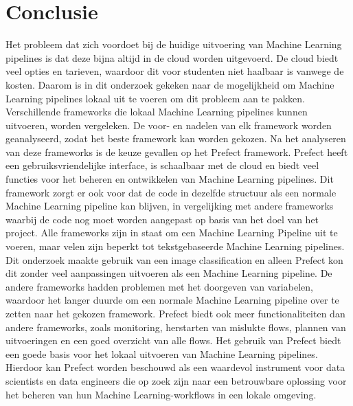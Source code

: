 
\chapter{Conclusie}%
\label{ch:conclusie}



Het probleem dat zich voordoet bij de huidige uitvoering van Machine Learning pipelines is dat deze bijna altijd in de cloud worden uitgevoerd. De cloud biedt veel opties en tarieven, waardoor dit voor studenten niet haalbaar is vanwege de kosten.
Daarom is in dit onderzoek gekeken naar de mogelijkheid om Machine Learning pipelines lokaal uit te voeren om dit probleem aan te pakken. Verschillende frameworks die lokaal Machine Learning pipelines kunnen uitvoeren, worden vergeleken. De voor- en nadelen van elk framework worden geanalyseerd, zodat het beste framework kan worden gekozen.
Na het analyseren van deze frameworks is de keuze gevallen op het Prefect framework. Prefect heeft een gebruiksvriendelijke interface, is schaalbaar met de cloud en biedt veel functies voor het beheren en ontwikkelen van Machine Learning pipelines. Dit framework zorgt er ook voor dat de code in dezelfde structuur als een normale Machine Learning pipeline kan blijven, in vergelijking met andere frameworks waarbij de code nog moet worden aangepast op basis van het doel van het project.
Alle frameworks zijn in staat om een Machine Learning Pipeline uit te voeren, maar velen zijn beperkt tot tekstgebaseerde Machine Learning pipelines. Dit onderzoek maakte gebruik van een image classification en alleen Prefect kon dit zonder veel aanpassingen uitvoeren als een Machine Learning pipeline. De andere frameworks hadden problemen met het doorgeven van variabelen, waardoor het langer duurde om een normale Machine Learning pipeline over te zetten naar het gekozen framework.
Prefect biedt ook meer functionaliteiten dan andere frameworks, zoals monitoring, herstarten van mislukte flows, plannen van uitvoeringen en een goed overzicht van alle flows. Het gebruik van Prefect biedt een goede basis voor het lokaal uitvoeren van Machine Learning pipelines.
Hierdoor kan Prefect worden beschouwd als een waardevol instrument voor data scientists en data engineers die op zoek zijn naar een betrouwbare oplossing voor het beheren van hun Machine Learning-workflows in een lokale omgeving.


